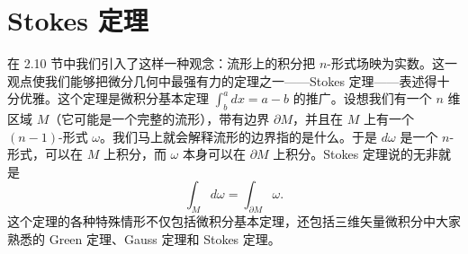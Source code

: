 \chapter{Stokes 定理}

在 2.10 节中我们引入了这样一种观念：流形上的积分把 $n$-形式场映为实数。这一观点使我们能够把微分几何中最强有力的定理之一——Stokes 定理——表述得十分优雅。这个定理是微积分基本定理 $\int_b^a dx = a - b$ 的推广。设想我们有一个 $n$ 维区域 $M$（它可能是一个完整的流形），带有边界 $\partial M$，并且在 $M$ 上有一个 $(n-1)$-形式 $\omega$。我们马上就会解释流形的边界指的是什么。于是 $d\omega$ 是一个 $n$-形式，可以在 $M$ 上积分，而 $\omega$ 本身可以在 $\partial M$ 上积分。Stokes 定理说的无非就是
\begin{equation*}
\boxed{\int_M d\omega = \int_{\partial M} \omega.}
\tag{E.1}
\end{equation*}
这个定理的各种特殊情形不仅包括微积分基本定理，还包括三维矢量微积分中大家熟悉的 Green 定理、Gauss 定理和 Stokes 定理。

